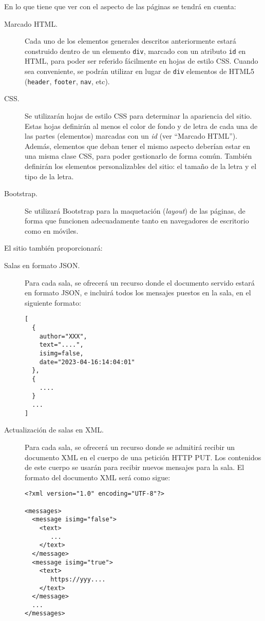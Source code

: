 En lo que tiene que ver con el aspecto de las páginas se tendrá en cuenta:

\begin{description}
\item[Marcado HTML.] Cada uno de los elementos generales descritos anteriormente estará construido dentro de un elemento \texttt{div}, marcado con un atributo \texttt{id} en HTML, para poder ser referido fácilmente en hojas de estilo CSS. Cuando sea conveniente, se podrán utilizar en lugar de \texttt{div} elementos de HTML5 (\texttt{header}, \texttt{footer}, \texttt{nav}, etc).

\item[CSS.] Se utilizarán hojas de estilo CSS para determinar la apariencia del sitio. Estas hojas definirán al menos el color de fondo y de letra de cada una de las partes (elementos) marcadas con un \emph{id} (ver ``Marcado HTML''). Además, elementos que deban tener el mismo aspecto deberían estar en una misma clase CSS, para poder gestionarlo de forma común. También definirán los elementos personalizables del sitio: el tamaño de la letra y el tipo de la letra.

\item[Bootstrap.] Se utilizará Bootstrap para la maquetación (\emph{layout}) de las páginas, de forma que funcionen adecuadamente tanto en navegadores de escritorio como en móviles.
\end{description}

El sitio también proporcionará:

\begin{description}
\item[Salas en formato JSON.] Para cada sala, se ofrecerá un recurso donde el documento servido estará en formato JSON, e incluirá todos los mensajes puestos en la sala, en el siguiente formato:

\begin{verbatim}
[
  {
    author="XXX",
    text="....",
    isimg=false,
    date="2023-04-16:14:04:01"
  },
  {
    ....
  }
  ...
]
\end{verbatim}

\item[Actualización de salas en XML.] Para cada sala, se ofrecerá un recurso donde se admitirá recibir un documento XML en el cuerpo de una petición HTTP PUT. Los contenidos de este cuerpo se usarán para recibir nuevos mensajes para la sala. El formato del documento XML será como sigue:

\begin{verbatim}
<?xml version="1.0" encoding="UTF-8"?>

<messages>
  <message isimg="false">
    <text>
       ...
    </text>
  </message>
  <message isimg="true">
    <text>
       https://yyy....
    </text>
  </message>
  ...
</messages>
\end{verbatim}

\end{description}


